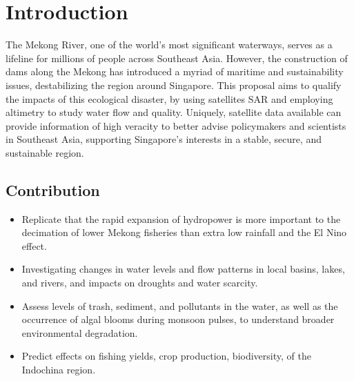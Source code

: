 \section{Introduction}
The Mekong River, one of the world's most significant waterways, serves as a lifeline for millions of people across Southeast Asia. However, the construction of dams along the Mekong has introduced a myriad of maritime and sustainability issues, destabilizing the region around Singapore. This proposal aims to qualify the impacts of this ecological disaster, by using satellites SAR and employing altimetry to study water flow and quality. Uniquely, satellite data available can provide information of high veracity to better advise policymakers and scientists in Southeast Asia, supporting Singapore's interests in a stable, secure, and sustainable region.


\subsection{Contribution}

\begin{itemize}
    \item Replicate that the rapid expansion of hydropower is more important to the decimation of lower Mekong fisheries than extra low rainfall and the El Nino effect.
	\item Investigating changes in water levels and flow patterns in local basins, lakes, and rivers, and impacts on  droughts and water scarcity.
	\item Assess levels of trash, sediment, and pollutants in the water, as well as the occurrence of algal blooms during monsoon pulses, to understand broader environmental degradation.
	\item Predict effects on fishing yields, crop production, biodiversity, of the Indochina region.
\end{itemize}

